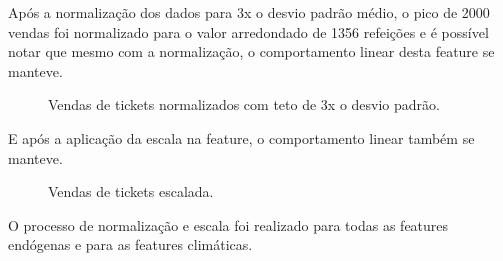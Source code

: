 \documentclass[	12pt, Times, openright, twoside, a4paper, english, brazil]{abntex2}
\begin{document}
                    Após a normalização dos dados para 3x o desvio padrão médio, o pico de 2000 vendas foi normalizado para o valor arredondado de 1356 refeições e é possível notar que mesmo com a normalização, o comportamento linear desta feature se manteve.
                    \begin{figure}[!ht]
                    	\caption{Vendas de tickets normalizados com teto de 3x o desvio padrão. \label{fig:feature_sem_outliers} }
                    \end{figure}
                    E após a aplicação da escala na feature, o comportamento linear também se manteve.
                    \begin{figure}[!ht]
                    	\caption{Vendas de tickets escalada. \label{fig:feature_sem_outliers_escalada} }
                    \end{figure}
                    
                    O processo de normalização e escala foi realizado para todas as features endógenas e para as features climáticas.
                    
\end{document}
